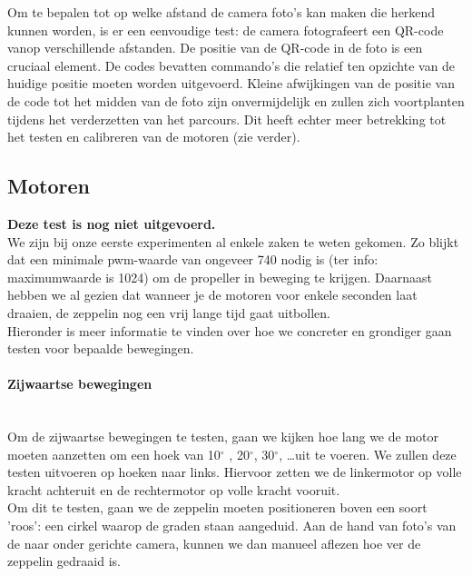 \documentclass[eind]{penoverslag}
\begin{document}
Om te bepalen tot op welke afstand de camera foto's kan maken die herkend kunnen worden, is er een eenvoudige test: de camera fotografeert een QR-code vanop verschillende afstanden. 
De positie van de QR-code in de foto is een cruciaal element. De codes bevatten commando’s die relatief ten opzichte van de huidige positie moeten worden uitgevoerd. Kleine afwijkingen van de positie van de code tot het midden van de foto zijn onvermijdelijk en zullen zich voortplanten tijdens het verderzetten van het parcours. Dit heeft echter meer betrekking tot het testen en calibreren van de motoren (zie verder). \\


\subsection{Motoren}
\textbf{Deze test is nog niet uitgevoerd.} \\

We zijn bij onze eerste experimenten al enkele zaken te weten gekomen. Zo blijkt dat een minimale pwm-waarde van ongeveer 740 nodig is (ter info: maximumwaarde is 1024) om de propeller in beweging te krijgen. Daarnaast hebben we al gezien dat wanneer je de motoren voor enkele seconden laat draaien, de zeppelin nog een vrij lange tijd gaat uitbollen. \\

Hieronder is meer informatie te vinden over hoe we concreter en grondiger gaan testen voor bepaalde bewegingen. \\

\paragraph{Zijwaartse bewegingen} ~\\ 
Om de zijwaartse bewegingen te testen, gaan we kijken hoe lang we de motor moeten aanzetten om een hoek van 10$^\circ$ , 20$^\circ$, 30$^\circ$, \ldots uit te voeren. We zullen deze testen uitvoeren op hoeken naar links. Hiervoor zetten we de linkermotor op volle kracht achteruit en de rechtermotor op volle kracht vooruit. \\

Om dit te testen, gaan we de zeppelin moeten positioneren boven een soort 'roos': een cirkel waarop de graden staan aangeduid. Aan de hand van foto's van de naar onder gerichte camera, kunnen we dan manueel aflezen hoe ver de zeppelin gedraaid is. \\
\end{document}
